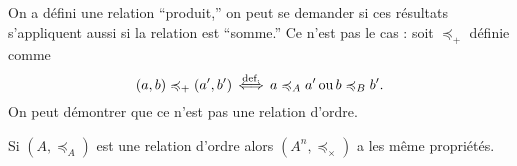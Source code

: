 \begin{rmk}
	On a défini une relation ``produit,'' on peut se demander si ces résultats s'appliquent aussi si la relation est ``somme.'' Ce n'est pas le cas : soit $\preceq_+$\/ définie comme \[
		(a, b) \preccurlyeq_+ (a', b') \mathop{\iff}^{\text{def.}} a \preccurlyeq_A a' \mathop{\text{ou}} b \preccurlyeq_B b'
	.\] On peut démontrer que ce n'est pas une relation d'ordre.
\end{rmk}

\begin{rmk}
	Si $(A, \preceq_A)$\/ est une relation d'ordre alors $(A^n, \preceq_\times)$\/ a les même propriétés.
\end{rmk}
